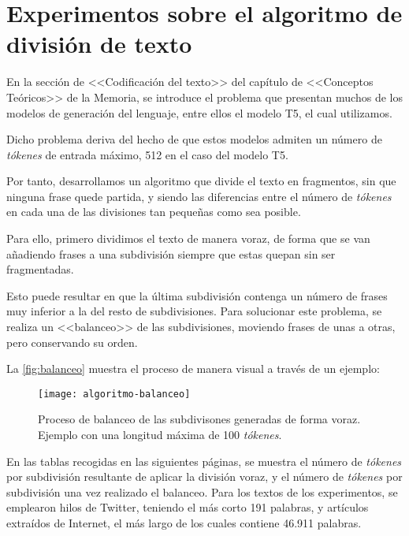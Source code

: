\chapter[Experimentos llevados a cabo]{Experimentos sobre el algoritmo de división de texto}

En la sección de <<Codificación del texto>> del capítulo de <<Conceptos Teóricos>> de la Memoria, se introduce el problema que presentan muchos de los modelos de generación del lenguaje, entre ellos el modelo T5, el cual utilizamos. 

Dicho problema deriva del hecho de que estos modelos admiten un número de \emph{tókenes} de entrada máximo, 512 en el caso del modelo T5.

Por tanto, desarrollamos un algoritmo que divide el texto en fragmentos, sin que ninguna frase quede partida, y siendo las diferencias entre el número de \emph{tókenes} en cada una de las divisiones tan pequeñas como sea posible.

Para ello, primero dividimos el texto de manera voraz, de forma que se van añadiendo frases a una subdivisión siempre que estas quepan sin ser fragmentadas. 

Esto puede resultar en que la última subdivisión contenga un número de frases muy inferior a la del resto de subdivisiones. Para solucionar este problema, se realiza un <<balanceo>> de las subdivisiones, moviendo frases de unas a otras, pero conservando su orden.

La \autoref{fig:balanceo} muestra el proceso de manera visual a través de un ejemplo:

\newpage

\begin{figure}[h!]
	\centering
	\texttt{[image: algoritmo-balanceo]}
	\vspace{-0.5cm}
	\caption[Algoritmo de balanceo.]{Proceso de balanceo de las subdivisones generadas de forma voraz. Ejemplo con una longitud máxima de 100 \emph{tókenes}.}
	\label{fig:balanceo}
\end{figure}

En las tablas recogidas en las siguientes páginas, se muestra el número de \emph{tókenes} por subdivisión resultante de aplicar la división voraz, y el número de \emph{tókenes} por subdivisión una vez realizado el balanceo. Para los textos de los experimentos, se emplearon hilos de Twitter, teniendo el más corto 191 palabras, y artículos extraídos de Internet, el más largo de los cuales contiene 46.911 palabras.

